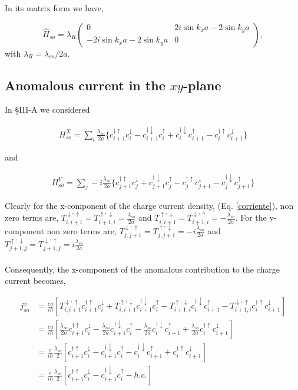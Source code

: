 \documentclass[10pt,prb,showpacs,amssymb,floatfix]{revtex4-1}
\newcommand{\dg}{\dagger}
\newcommand{\dna}{\downarrow}
\newcommand{\nn}{\nonumber}
\newcommand{\upa}{\uparrow}
\newcommand{\lam}{\lambda}
\begin{document}
In its matrix form we have,

\begin{equation}
\hat H_{so} =  \lambda_{R} \left(\begin{array}{cc} 
0  &  2i  \sin k_xa -2\sin k_ya \\
-2i \sin k_xa -2 \sin k_ya &  0
\end{array}\right),
\label{matso}
\end{equation}
 with $\lam_R=\lam_{so}/2a$.
 
\subsection{Anomalous current in the $xy$-plane}

In \S III-A we considered

\begin{align}
H_{so}^X = \sum_i \frac{\lam_{so}}{2a}\{ c_{i+1}^{\dg\upa}c_i^\dna - c_{i+1}^{\dg\dna} c_i^\upa +  c_{i}^{\dg\dna}c_{i+1}^\upa- c_{i}^{\dg\upa}c_{i+1}^\dna\}
\end{align}

and

\begin{align}
H_{so}^Y = \sum_j -i\frac{\lam_{so}}{2a}\{ c_{j+1}^{\dg\upa}c_j^\dna + c_{j+1}^{\dg\dna} c_j^\upa - c_{j}^{\dg\upa}c_{j+1}^\dna- c_{j}^{\dg\dna}c_{j+1}^\upa\}
\end{align}

Clearly for the x-component of the charge current density, (Eq. \eqref{corriente}), non zero terms are, $T^{\dna,\upa}_{i,i+1} = T^{\upa,\dna}_{i+1,i} =\frac{\lam_{so}}{2a}$ and $T^{\upa,\dna}_{i,i+1} = T^{\dna,\upa}_{i+1,i} =-\frac{\lam_{so}}{2a}$. For the y-component non zero terms are, $T^{\dna,\upa}_{j,j+1}= T^{\upa,\dna}_{j,j+1} =-i\frac{\lam_{so}}{2a}$ and $T^{\upa,\dna}_{j+1,j} =  T^{\dna,\upa}_{j+1,j} =  i\frac{\lam_{so}}{2a}$
\begin{align}
\end{align}

Consequently, the x-component of the anomalous contribution to the charge current becomes,

\begin{align}
j^{x}_{so}&=\frac{ea}{i\hbar} [T^{\dna,\upa}_{i,i+1} c^{\dagger\upa}_{i+1} c^{\dna}_i + T^{\upa,\dna}_{i,i+1} c^{\dagger\dna}_{i+1} c^{\upa}_i  - T^{\upa,\dna}_{i+1,i} c^{\dagger\dna}_{i} c^{\upa}_{i+1} - T^{\dna,\upa}_{i+1,i} c^{\dagger\upa}_{i} c^{\dna}_{i+1}] \nn\\
&=\frac{ea}{i\hbar} [\frac{\lam_{so}}{2a} c^{\dagger\upa}_{i+1} c^{\dna}_i - \frac{\lam_{so}}{2a} c^{\dagger\dna}_{i+1} c^{\upa}_i  - \frac{\lam_{so}}{2a} c^{\dagger\dna}_{i} c^{\upa}_{i+1} + \frac{\lam_{so}}{2a} c^{\dagger\upa}_{i} c^{\dna}_{i+1}] \nn\\
&=\frac{e}{i\hbar}\frac{\lam_{so}}{2} [c^{\dagger\upa}_{i+1} c^{\dna}_i -  c^{\dagger\dna}_{i+1} c^{\upa}_i  - c^{\dagger\dna}_{i} c^{\upa}_{i+1} +  c^{\dagger\upa}_{i} c^{\dna}_{i+1}] \nn\\
&=\frac{e}{i\hbar}\frac{\lam_{so}}{2} [c^{\dagger\upa}_{i+1} c^{\dna}_i -   c^{\dagger\dna}_{i+1} c^{\upa}_{i} - h.c.] 
\end{align}
\end{document}
